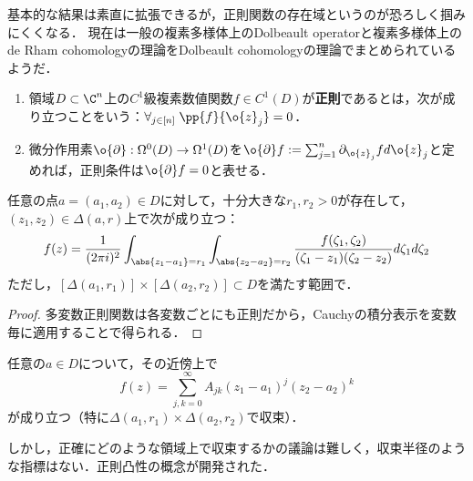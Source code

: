 \documentclass[uplatex, dvipdfmx]{jsreport}
\begin{document}
\begin{tcolorbox}[colframe=ForestGreen, colback=ForestGreen!10!white,breakable,colbacktitle=ForestGreen!40!white,coltitle=black,fonttitle=\bfseries\sffamily,
title=一変数と多変数で同じところ]
    基本的な結果は素直に拡張できるが，正則関数の存在域というのが恐ろしく掴みにくくなる．
    現在は一般の複素多様体上のDolbeault operatorと複素多様体上のde Rham cohomologyの理論をDolbeault cohomologyの理論でまとめられているようだ．
\end{tcolorbox}

\begin{definition}\mbox{}
    \begin{enumerate}
        \item 領域$D\subset\C^n$上の$C^1$級複素数値関数$f\in C^1(D)$が\textbf{正則}であるとは，次が成り立つことをいう：$\forall_{j\in[n]}\;\pp{f}{\o{z}_j}=0$．
        \item 微分作用素$\o{\partial}:\Omega^0(D)\to\Omega^1(D)$を$\o{\partial}f:=\sum_{j=1}^n\partial_{\o{z}_j}fd\o{z}_j$と定めれば，正則条件は$\o{\partial}f=0$と表せる．
    \end{enumerate}
\end{definition}

\begin{theorem}[Cauchyの積分表示]\label{thm-Cauchy-integral-expression-multivariable}
    任意の点$a=(a_1,a_2)\in D$に対して，十分大きな$r_1,r_2>0$が存在して，$(z_1,z_2)\in\Delta(a,r)$上で次が成り立つ：
    \[f(z)=\frac{1}{(2\pi i)^2}\int_{\abs{z_1-a_1}=r_1}\int_{\abs{z_2-a_2}=r_2}\frac{f(\zeta_1,\zeta_2)}{(\zeta_1-z_1)(\zeta_2-z_2)}d\zeta_1d\zeta_2\]
    ただし，$[\Delta(a_1,r_1)]\times[\Delta(a_2,r_2)]\subset D$を満たす範囲で．
\end{theorem}
\begin{proof}
    多変数正則関数は各変数ごとにも正則だから，Cauchyの積分表示を変数毎に適用することで得られる．
\end{proof}

\begin{theorem}[多変数複素関数の冪級数展開]
    任意の$a\in D$について，その近傍上で
    \[f(z)=\sum_{j,k=0}^\infty A_{jk}(z_1-a_1)^j(z_2-a_2)^k\]
    が成り立つ（特に$\Delta(a_1,r_1)\times\Delta(a_2,r_2)$で収束）．
\end{theorem}
\begin{remark}
    しかし，正確にどのような領域上で収束するかの議論は難しく，収束半径のような指標はない．正則凸性の概念が開発された．
\end{remark}
\end{document}

